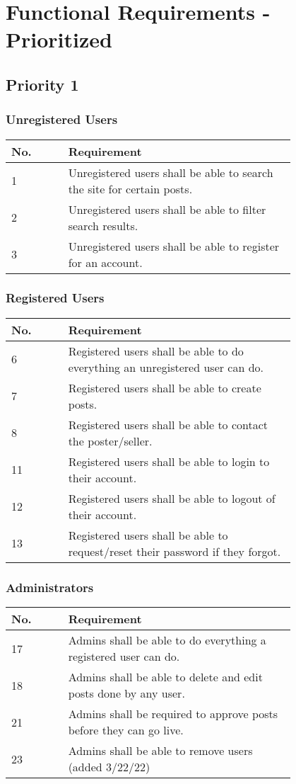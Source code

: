 \section{Functional Requirements - Prioritized}

\subsection{Priority 1}
\subsubsection{Unregistered Users}
\begin{tabular}{ | l | p{0.8\linewidth} | }
\hline
No. & Requirement\\\hline
1 & Unregistered users shall be able to search the site for certain posts.\\\hline
2 & Unregistered users shall be able to filter search results.\\\hline
3 & Unregistered users shall be able to register for an account.\\\hline
\end{tabular}

\subsubsection{Registered Users}
\begin{tabular}{ | l | p{0.8\linewidth} | }
\hline
No. & Requirement\\\hline
6 & Registered users shall be able to do everything an unregistered user can do.\\\hline
7 & Registered users shall be able to create posts.\\\hline
8 & Registered users shall be able to contact the poster/seller. \\\hline
11 & Registered users shall be able to login to their account.\\\hline
12 & Registered users shall be able to logout of their account.\\\hline
13 & Registered users shall be able to request/reset their password if they forgot.\\\hline
\end{tabular}

\subsubsection{Administrators}
\begin{tabular}{ | l | p{0.8\linewidth} | }
\hline
No. & Requirement\\\hline
17 & Admins shall be able to do everything a registered user can do.\\\hline
18 & Admins shall be able to delete and edit posts done by any user.\\\hline
21 & Admins shall be required to approve posts before they can go live.\\\hline
23 & Admins shall be able to remove users (added 3/22/22)\\\hline
\end{tabular}


